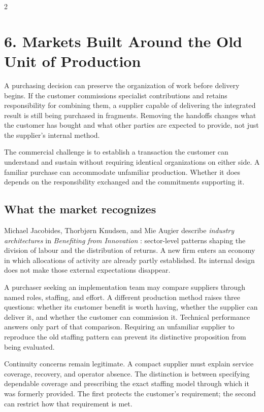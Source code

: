 \clearpage
\begin{multicols}{2}

\section{6. Markets Built Around the Old Unit of
Production}\label{markets-built-around-the-old-unit-of-production}

A purchasing decision can preserve the organization of work before
delivery begins. If the customer commissions specialist contributions
and retains responsibility for combining them, a supplier capable of
delivering the integrated result is still being purchased in fragments.
Removing the handoffs changes what the customer has bought and what
other parties are expected to provide, not just the supplier's internal
method.

The commercial challenge is to establish a transaction the customer can
understand and sustain without requiring identical organizations on
either side. A familiar purchase can accommodate unfamiliar production.
Whether it does depends on the responsibility exchanged and the
commitments supporting it.

\subsection{What the market
recognizes}\label{what-the-market-recognizes}

Michael Jacobides, Thorbjørn Knudsen, and Mie Augier describe
\emph{industry architectures} in \emph{Benefiting from Innovation}
\citep{jacobides2006architectures}: sector-level patterns shaping the
division of labour and the distribution of returns. A new firm enters an
economy in which allocations of activity are already partly established.
Its internal design does not make those external expectations disappear.

A purchaser seeking an implementation team may compare suppliers through
named roles, staffing, and effort. A different production method raises
three questions: whether its customer benefit is worth having, whether
the supplier can deliver it, and whether the customer can commission it.
Technical performance answers only part of that comparison. Requiring an
unfamiliar supplier to reproduce the old staffing pattern can prevent
its distinctive proposition from being evaluated.

Continuity concerns remain legitimate. A compact supplier must explain
service coverage, recovery, and operator absence. The distinction is
between specifying dependable coverage and prescribing the exact
staffing model through which it was formerly provided. The first
protects the customer's requirement; the second can restrict how that
requirement is met.


\end{multicols}
